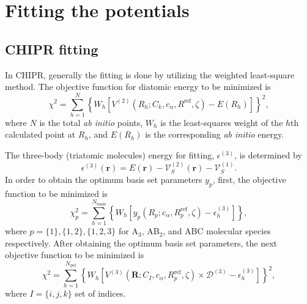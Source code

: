 \documentclass[12pt]{article}
\begin{document}
\section{Fitting the potentials}
\label{section:fit}
\subsection{CHIPR fitting}
In CHIPR, generally the fitting is done by utilizing the weighted least-square method. The objective function for diatomic energy to be minimized is
\begin{equation}
    \chi^2 = \sum_{h=1}^N\left\{W_h\left[V^{(2)}(R_h; C_k, c_\alpha, R^{\text{ref}}, \zeta)-E(R_h)\right]\right\}^2,
\end{equation}
where $N$ is the total \textit{ab initio} points, $W_h$ is the least-squares weight of the $h$th calculated point at $R_h$, and $E(R_h)$ is the corresponding \textit{ab initio} energy.


The three-body (triatomic molecules) energy for fitting, $\epsilon^{(3)}$, is determined by
\begin{equation}
    \epsilon^{(3)}(\mathbf{r}) = E(\mathbf{r}) - \mathcal{V}_S^{(2)}(\mathbf{r}) - \mathcal{V}_S^{(1)}.
\end{equation}
In order to obtain the optimum basis set parameters $y_p$, first, the objective function to be minimized is
\begin{equation}
    \chi^2_p = \sum^{N_{\text{basis}}}_{h=1}\left\{W_h\left[y_p(R_p;c_\alpha, R_p^{\text{ref}}, \zeta)-\epsilon^{(3)}_h\right]\right\},
    \label{eqchipr3obj}
\end{equation}
where $p=\{1\},\{1,2\},\{1,2,3\}$ for A$_3$, AB$_2$, and ABC molecular species respectively. After obtaining the optimum basis set parameters, the next objective function to be minimized is
\begin{equation}
    \chi^2 = \sum_{h=1}^{N_{\text{pol}}}\left\{W_h\left[V^{(3)}(\mathbf{R}; C_{I}, c_\alpha, R^{\text{ref}}_p, \zeta) \times \mathcal{D}^{(3)} - \epsilon^{(3)}_h\right]\right\}^2,
    \label{eqchipr3obj2}
\end{equation}
where $I=\{i,j,k\}$ set of indices.
\end{document}
